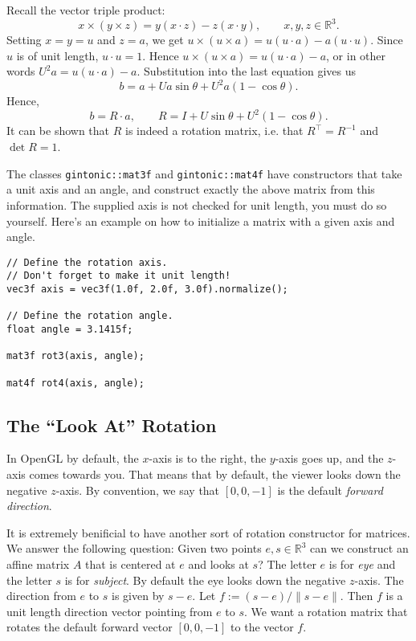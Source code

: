 \documentclass{article}
\begin{document}
Recall the vector triple product:
\[ x \times (y \times z) = y(x \cdot z) - z(x \cdot y), \qquad x,y,z \in \mathbb{R}^3. \]
Setting $x=y=u$ and $z=a$, we get $u \times (u \times a) = u(u \cdot a) - a(u \cdot u)$. Since $u$ is of unit length, $u \cdot u = 1$. Hence $u \times (u \times a) = u(u\cdot a) - a$, or in other words $U^2 a = u(u\cdot a) - a$. Substitution into the last equation gives us
\[ b = a + Ua \sin \theta + U^2 a (1- \cos \theta). \]
Hence,
\[ b = R \cdot a, \qquad R = I + U \sin \theta + U^2 (1-\cos \theta). \]
It can be shown that $R$ is indeed a rotation matrix, i.e. that $R^\intercal = R^{-1}$ and $\det R = 1$.

The classes \texttt{gintonic::mat3f} and \texttt{gintonic::mat4f} have constructors that take a unit axis and an angle, and construct exactly the above matrix from this information. The supplied axis is not checked for unit length, you must do so yourself. Here's an example on how to initialize a matrix with a given axis and angle.

\begin{lstlisting}
// Define the rotation axis.
// Don't forget to make it unit length!
vec3f axis = vec3f(1.0f, 2.0f, 3.0f).normalize();

// Define the rotation angle.
float angle = 3.1415f;

mat3f rot3(axis, angle);

mat4f rot4(axis, angle);
\end{lstlisting}

\subsection{The ``Look At'' Rotation}

In OpenGL by default, the $x$-axis is to the right, the $y$-axis goes up, and the $z$-axis comes towards you. That means that by default, the viewer looks down the negative $z$-axis. By convention, we say that $[0,0,-1]$ is the default \emph{forward direction}.

It is extremely benificial to have another sort of rotation constructor for matrices. We answer the following question: Given two points $e,s \in \mathbb{R}^3$ can we construct an affine matrix $A$ that is centered at $e$ and looks at $s$? The letter $e$ is for \emph{eye} and the letter $s$ is for \emph{subject}. By default the eye looks down the negative $z$-axis. The direction from $e$ to $s$ is given by $s-e$. Let $f := (s-e) / \|s-e\|$. Then $f$ is a unit length direction vector pointing from $e$ to $s$. We want a rotation matrix that rotates the default forward vector $[0,0,-1]$ to the vector $f$.
\end{document}
